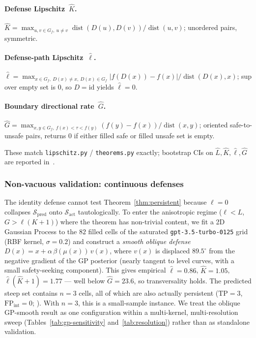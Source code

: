 \documentclass{article}
\newcommand{\dist}{\operatorname{dist}}
\begin{document}
\paragraph{Defense Lipschitz~$\hat K$.}
$\hat K = \max_{u, v \in G_{f},\ u \neq v}
\dist(D(u), D(v)) / \dist(u, v)$; unordered pairs, symmetric.

\paragraph{Defense-path Lipschitz~$\hat\ell$.}
$\hat\ell = \max_{x \in G_{f},\ D(x) \neq x,\ D(x) \in G_{f}}
\lvert f(D(x)) - f(x) \rvert / \dist(D(x), x)$;
sup over empty set is $0$, so $D = \mathrm{id}$ yields
$\hat\ell = 0$.

\paragraph{Boundary directional rate~$\hat G$.}
$\hat G = \max_{x, y \in G_{f},\ f(x) < \tau < f(y)}
(f(y) - f(x)) / \dist(x, y)$; oriented safe-to-unsafe pairs,
returns $0$ if either filled safe or filled unsafe set is empty.

These match \texttt{lipschitz.py} / \texttt{theorems.py}
exactly; bootstrap CIs on $\hat L, \hat K, \hat\ell, \hat G$ are
reported in~.

\subsubsection{Non-vacuous validation: continuous defenses}
\label{sec:gp-instance}

The identity defense cannot test Theorem~\ref{thm:persistent}
because $\ell = 0$ collapses $\mathcal{S}_{\text{pred}}$ onto
$\mathcal{S}_{\text{act}}$ tautologically. To enter the
anisotropic regime ($\ell < L$, $G > \ell(K{+}1)$) where the
theorem has non-trivial content, we fit a 2D Gaussian Process to
the $82$ filled cells of the saturated
\texttt{gpt-3.5-turbo-0125} grid (RBF kernel, $\sigma = 0.2$) and
construct a \emph{smooth oblique defense}
$D(x) = x + \alpha\,\beta(\mu(x))\,v(x)$, where $v(x)$ is
displaced $89.5^{\circ}$ from the negative gradient of the GP
posterior (nearly tangent to level curves, with a small
safety-seeking component). This gives empirical
$\hat\ell = 0.86$, $\hat K = 1.05$, $\hat\ell(\hat K{+}1) = 1.77$
--- well below $\hat G = 23.6$, so transversality holds. The
predicted steep set contains $n = 3$ cells, all of which are also
actually persistent ($\text{TP} = 3$, $\text{FP}_{\text{int}}
= 0$; ). With $n = 3$,
this is a small-sample instance. We treat the oblique GP-smooth
result as one configuration within a multi-kernel,
multi-resolution sweep (Tables~\ref{tab:gp-sensitivity}
and~\ref{tab:resolution}) rather than as standalone validation.
\end{document}
